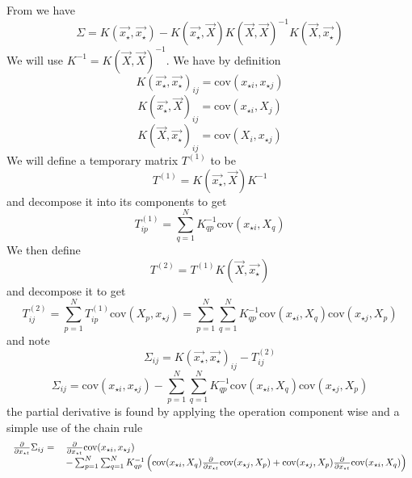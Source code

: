 \documentclass[phd,tocprelim]{cornell}
\begin{document}
From \cite{RW} we have
\begin{equation}
 \Sigma = K(\vec{x_{\star}}, \vec{x_{\star}}) - K(\vec{x_{\star}}, \vec{X}) K(\vec{X}, \vec{X})^{-1} K(\vec{X}, \vec{x_{\star}})
\end{equation}
We will use $K^{-1} = K(\vec{X}, \vec{X})^{-1}$. We have by definition
\begin{equation}
 K(\vec{x_{\star}}, \vec{x_{\star}})_{ij} = \mbox{cov}(x_{\star i}, x_{\star j})
\end{equation}
\begin{equation}
 K(\vec{x_{\star}}, \vec{X})_{ij} = \mbox{cov}(x_{\star i}, X_{j})
\end{equation}
\begin{equation}
 K(\vec{X}, \vec{x_{\star}})_{ij} = \mbox{cov}(X_{i}, x_{\star j})
\end{equation}
We will define a temporary matrix $T^{(1)}$ to be
\begin{equation}
 T^{(1)} = K(\vec{x_{\star}}, \vec{X}) K^{-1}
\end{equation}
and decompose it into its components to get
\begin{equation}
 T^{(1)}_{ip} = \sum_{q = 1}^{N} K^{-1}_{qp} \mbox{cov}(x_{\star i}, X_{q})
\end{equation}
We then define
\begin{equation}
 T^{(2)} = T^{(1)} K(\vec{X}, \vec{x_{\star}})
\end{equation}
and decompose it to get
\begin{equation}
 T^{(2)}_{ij} = \sum_{p = 1}^{N} T^{(1)}_{ip} \mbox{cov}(X_{p}, x_{\star j}) = \sum_{p = 1}^{N} \sum_{q = 1}^{N} K^{-1}_{qp} \mbox{cov}(x_{\star i}, X_{q}) \mbox{cov}(x_{\star j}, X_{p})
\end{equation}
and note
\begin{equation}
 \Sigma_{ij} = K(\vec{x_{\star}}, \vec{x_{\star}})_{ij} - T^{(2)}_{ij}
\end{equation}
\begin{equation}
 \Sigma_{ij} = \mbox{cov}(x_{\star i}, x_{\star j}) - \sum_{p = 1}^{N} \sum_{q = 1}^{N} K^{-1}_{qp} \mbox{cov}(x_{\star i}, X_{q}) \mbox{cov}(x_{\star j}, X_{p})
\end{equation}
the partial derivative is found by applying the operation component wise and a simple use of the chain rule
\begin{equation}
 \begin{tabular}{rl}
 $\frac{\partial}{\partial x_{\star t}} \Sigma_{ij} =$ & $\frac{\partial}{\partial x_{\star t}} \mbox{cov}(x_{\star i}, x_{\star j})$ \\
 & $- \sum_{p = 1}^{N} \sum_{q = 1}^{N} K^{-1}_{qp} \left( \mbox{cov}(x_{\star i}, X_{q}) \frac{\partial}{\partial x_{\star t}} \mbox{cov}(x_{\star j}, X_{p}) + \mbox{cov}(x_{\star j}, X_{p}) \frac{\partial}{\partial x_{\star t}} \mbox{cov}(x_{\star i}, X_{q}) \right)$
 \end{tabular}
\end{equation}
\end{document}
